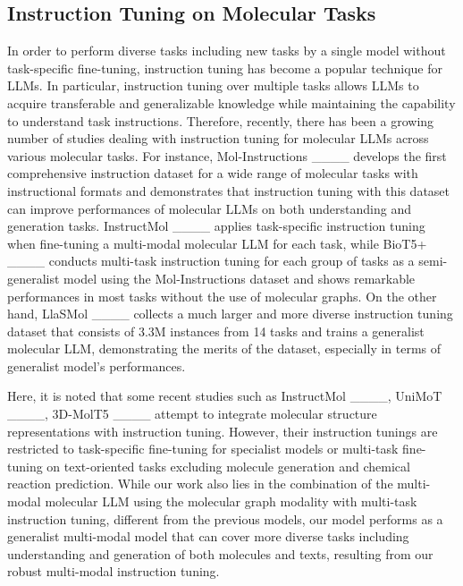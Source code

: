 \subsection{Instruction Tuning on Molecular Tasks}
In order to perform diverse tasks including new tasks by a single model without task-specific fine-tuning, instruction tuning has become a popular technique for LLMs. In particular, instruction tuning over multiple tasks allows LLMs to acquire transferable and generalizable knowledge while maintaining the capability to understand task instructions. Therefore, recently, there has been a growing number of studies dealing with instruction tuning for molecular LLMs across various molecular tasks. For instance, Mol-Instructions ____ develops the first comprehensive instruction dataset for a wide range of molecular tasks with instructional formats and demonstrates that instruction tuning with this dataset can improve performances of molecular LLMs on both understanding and generation tasks. InstructMol ____ applies task-specific instruction tuning when fine-tuning a multi-modal molecular LLM for each task, while BioT5+ ____ conducts multi-task instruction tuning for each group of tasks as a semi-generalist model using the Mol-Instructions dataset and shows remarkable performances in most tasks without the use of molecular graphs. On the other hand, LlaSMol ____ collects a much larger and more diverse instruction tuning dataset that consists of 3.3M instances from 14 tasks and trains a generalist molecular LLM, demonstrating the merits of the dataset, especially in terms of generalist model's performances. 

Here, it is noted that some recent studies such as InstructMol ____, UniMoT ____, 3D-MolT5 ____ attempt to integrate molecular structure representations with instruction tuning. However, their instruction tunings are restricted to task-specific fine-tuning for specialist models or multi-task fine-tuning on text-oriented tasks excluding molecule generation and chemical reaction prediction. While our work also lies in the combination of the multi-modal molecular LLM using the molecular graph modality with multi-task instruction tuning, different from the previous models, our model performs as a generalist multi-modal model that can cover more diverse tasks including understanding and generation of both molecules and texts, resulting from our robust multi-modal instruction tuning.

